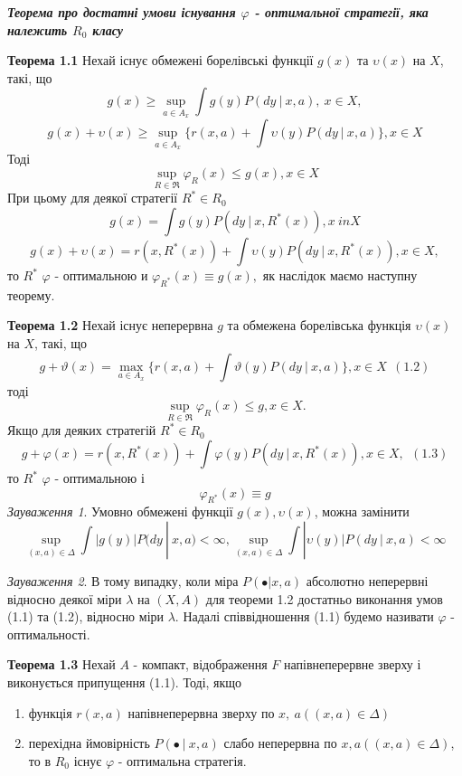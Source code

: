 \documentclass[a4paper, 14pt]{extarticle}
\begin{document}
\begin{center}
	\textbf{\textit{Теорема про достатні умови існування $\varphi$ - оптимальної стратегії, яка належить $R_0$ класу }}\newline
\end{center}

\textbf{Теорема 1.1}\newline
Нехай існує обмежені борелівські функції $g(x)$ та $\upsilon(x)$ на $X$, такі, що $$ g(x)\geq \sup_{a \in A_x} \int g(y) P(dy \ | \ x,a), \ x \in X, $$
$$g(x)+\upsilon(x) \geq \sup_{a \in A_x} \lbrace r(x,a)+ \int \upsilon(y)P(dy \ | \ x,a) \rbrace, x \in X$$\newline
Тоді 
$$ \sup_{R \in \Re} \varphi_R(x) \leq g(x), x \in X $$
При цьому для деякої стратегії $R^*\in R_0$
$$g(x) = \int g(y)P(dy \ | \ x, R^*(x)), x \ in X$$
$$g(x) + \upsilon(x) = r(x,R^*(x))+ \int \upsilon(y) P(dy \ | \ x, R^*(x)), x \in X,$$
то $R^*$ $\varphi$ - оптимальною и \newline 
$\varphi_{R^*}(x)  \equiv g(x) ,$ як наслідок маємо наступну теорему.\newline

\textbf{Теорема 1.2}\newline
Нехай існує неперервна $g$ та обмежена борелівська функція $\upsilon(x)$ на $X$, такі, що 
$$ g+\vartheta(x)  = \max_{a \in A_x}\lbrace r(x,a)+ \int \vartheta(y) P(dy \ | \ x,a)\rbrace, x \in X \ \ (1.2) $$
тоді $$ \sup_{R \in \Re} \varphi_R (x) \leq g , x \in X. $$
Якщо для деяких стратегій $R^* \in R_0$\newline
$$ g +\varphi(x) = r(x, R^*(x))+\int \varphi(y)P(dy \ | \ x,R^*(x)), x \in X,  \ \ (1.3) $$
то $R^*$ $\varphi$ - оптимальною і 
$$ \varphi_{R^*}(x) \equiv g  $$
\textit{Зауваження 1}. 
Умовно обмежені функції $ g(x), \upsilon (x) $, можна замінити
$$ \sup_{(x,a) \in \Delta} \int |g(y)| P(dy \ | \ x,a) < \infty , \sup_{(x,a) \in \Delta} \int |\upsilon(y)| P(dy \ | \ x,a)<\infty$$

\textit{Зауваження 2}. В тому випадку, коли міра $P(\bullet | x,a)$ абсолютно неперервні відносно деякої міри $\lambda$ на $ (X,A)$ для теореми 1.2 достатньо виконання умов (1.1) та (1.2), відносно міри $\lambda$.\newline
Надалі співвідношення (1.1) будемо називати $\varphi$ - оптимальності.\newline

\textbf{Теорема 1.3}\newline
Нехай $A$ - компакт, відображення $F$ напівнеперервне зверху і виконується припущення (1.1). Тоді, якщо
\begin{enumerate}
\item функція $r(x,a)$ напівнеперервна зверху по $x, \ a ((x,a) \in \Delta)$
\item перехідна ймовірність $P(\bullet  \ | \ x,a)$ слабо неперервна по $x,a ((x,a) \in \Delta)$, то в $R_0$ існує $\varphi$ - оптимальна стратегія.
\end{enumerate}
\end{document}
